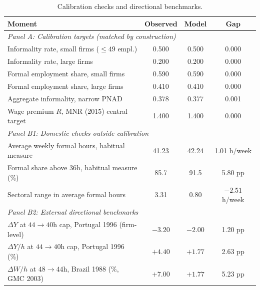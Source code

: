 \begin{table}[htbp]
\centering
\caption{Calibration checks and directional benchmarks.}\label{tab:calibration_fit}
\small
\begin{tabular}{lccc}
\hline\hline
Moment & Observed & Model & Gap \\
\hline
\multicolumn{4}{l}{\textit{Panel A: Calibration targets (matched by construction)}} \\
\hline
Informality rate, small firms ($\leq 49$ empl.)  & 0.500 & 0.500 & 0.000 \\
Informality rate, large firms                    & 0.200 & 0.200 & 0.000 \\
Formal employment share, small firms             & 0.590 & 0.590 & 0.000 \\
Formal employment share, large firms             & 0.410 & 0.410 & 0.000 \\
Aggregate informality, narrow PNAD               & 0.378 & 0.377 & 0.001 \\
Wage premium $R$, MNR (2015) central target       & 1.400 & 1.400 & 0.000 \\
\hline
\multicolumn{4}{l}{\textit{Panel B1: Domestic checks outside calibration}} \\
\hline
Average weekly formal hours, habitual measure            & 41.23 & 42.24 & 1.01 h/week \\
Formal share above $36$h, habitual measure (\%)          & 85.7  & 91.5  & 5.80 pp \\
Sectoral range in average formal hours                   & 3.31  & 0.80  & $-2.51$ h/week \\
\hline
\multicolumn{4}{l}{\textit{Panel B2: External directional benchmarks}} \\
\hline
$\Delta Y$ at $44\to 40$h cap, Portugal 1996 (firm-level) & $-3.20$ & $-2.00$ & 1.20 pp \\
$\Delta Y/h$ at $44\to 40$h cap, Portugal 1996 (\%)       & $+4.40$ & $+1.77$ & 2.63 pp \\
$\Delta W/h$ at $48\to 44$h, Brazil 1988 (\%, GMC 2003)   & $+7.00$ & $+1.77$ & 5.23 pp \\
\hline\hline
\end{tabular}
\\[2pt]
\begin{minipage}{0.95\textwidth}
\justifying

\end{minipage}
\end{table}

